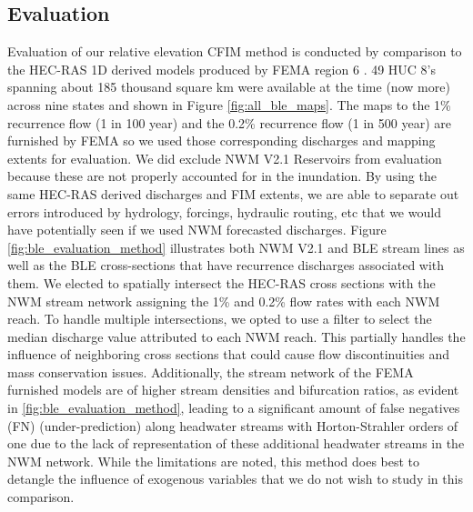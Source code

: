 \subsection{Evaluation}
\label{ssec:evaluation}
%
Evaluation of our relative elevation CFIM method is conducted by comparison to the HEC-RAS 1D derived models produced by FEMA region 6 \cite{fema2021base,fema2021estimated}.
49 HUC 8's spanning about 185 thousand square km were available at the time (now more) across nine states and shown in Figure \ref{fig:all_ble_maps}.
The maps to the 1\% recurrence flow (1 in 100 year) and the 0.2\% recurrence flow (1 in 500 year) are furnished by FEMA so we used those corresponding discharges and mapping extents for evaluation.
We did exclude NWM V2.1 Reservoirs from evaluation because these are not properly accounted for in the inundation.
By using the same HEC-RAS derived discharges and FIM extents, we are able to separate out errors introduced by hydrology, forcings, hydraulic routing, etc that we would have potentially seen if we used NWM forecasted discharges.
Figure \ref{fig:ble_evaluation_method} illustrates both NWM V2.1 and BLE stream lines as well as the BLE cross-sections that have recurrence discharges associated with them.
We elected to spatially intersect the HEC-RAS cross sections with the NWM stream network assigning the 1\% and 0.2\% flow rates with each NWM reach. 
To handle multiple intersections, we opted to use a filter to select the median discharge value attributed to each NWM reach.
This partially handles the influence of neighboring cross sections that could cause flow discontinuities and mass conservation issues.
Additionally, the stream network of the FEMA furnished models are of higher stream densities and bifurcation ratios, as evident in \ref{fig:ble_evaluation_method}, leading to a significant amount of false negatives (FN) (under-prediction) along headwater streams with Horton-Strahler orders of one due to the lack of representation of these additional headwater streams in the NWM network.
While the limitations are noted, this method does best to detangle the influence of exogenous variables that we do not wish to study in this comparison.
%
